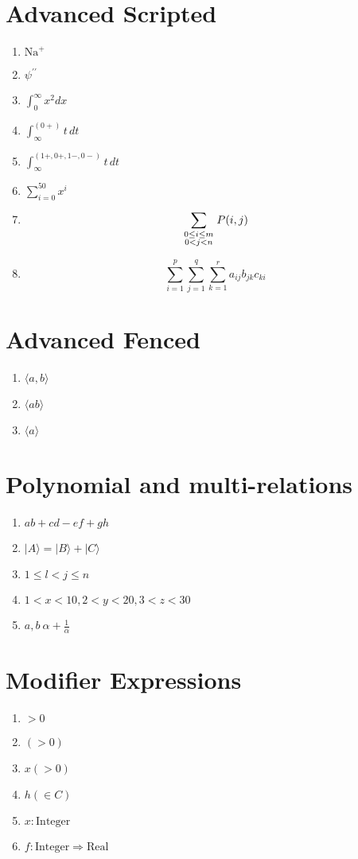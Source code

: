 \documentclass{article}
\begin{document}
\section{Advanced Scripted}
\begin{enumerate}
  \item $\mathrm{Na}^+$ %
  \item $\psi^{\prime\prime}$
  \item $\int_0^\infty x^2 dx$
  \item $\int_\infty^{(0+)} t\,dt$
  \item $\int_\infty^{(1+,0+,1−,0−)} t\,dt$
  \item $\sum_{i=0}^{50} x^i$
  \item $$\sum_{\scriptstyle0\le i\le m\atop\scriptstyle0<j<n}P(i,j)$$ %
  \item $$\sum_{i=1}^p\sum_{j=1}^q\sum_{k=1}^r a_{ij}b_{jk}c_{ki}$$ %
\end{enumerate}

\section{Advanced Fenced}
\begin{enumerate}
  \item $\langle a,b \rangle $ %
  \item $\langle ab \rangle $ %
  \item $\langle a \rangle$ %
\end{enumerate}

\section{Polynomial and multi-relations}
\begin{enumerate}
\item $ab + cd - ef + gh $
\item $|A\rangle = |B\rangle + |C\rangle$
\item $1 \leq l < j \leq n $
\item $1<x<10, 2<y<20, 3<z<30$
\item $a,b ~ \alpha + \frac{1}{\alpha}$
\end{enumerate}

\section{Modifier Expressions}
\begin{enumerate}
  \item $>0$
  \item $(>0)$
  \item $x(>0)$
  \item $h(\in C)$
  \item $x : \mathrm{Integer}$
  \item $f : \mathrm{Integer} \Rightarrow \mathrm{Real}$
\end{enumerate}
\end{document}
